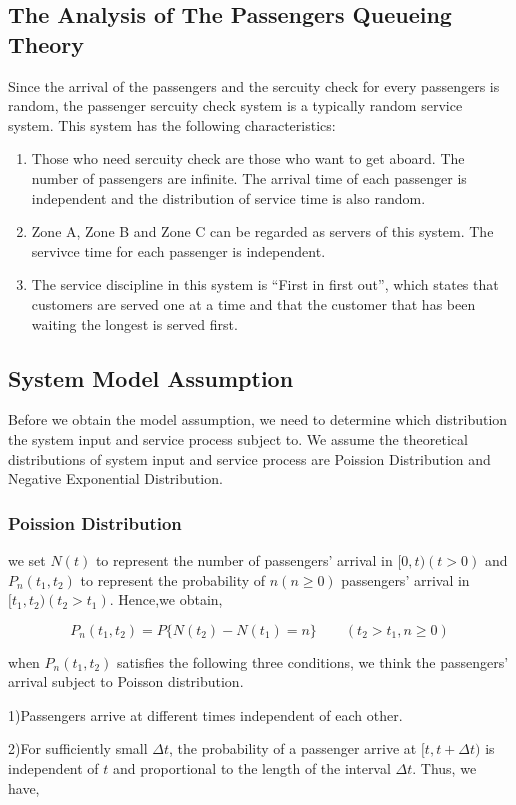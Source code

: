 \documentclass{mcmthesis}
\begin{document}
\subsection{The Analysis of The Passengers Queueing Theory}
		Since the arrival of the passengers and the sercuity check for every passengers is random, the passenger sercuity check system is a typically random service system. This system has the following characteristics:
			\begin {enumerate}
				\item Those who need sercuity check are those who want to get aboard. The number of passengers are infinite. The arrival time of each passenger is independent and the distribution of service time is also random.
				\item Zone A, Zone B and Zone C can be regarded as servers of this system. The servivce time for each passenger is independent.
				\item The service discipline in this system is ``First in first out'', which states that customers are served one at a time and that the customer that has been waiting the longest is served first.
			\end{enumerate}
\subsection{System Model Assumption}%
Before we obtain the model assumption, we need to determine which distribution the system input and service process subject to. We assume the theoretical distributions of system input and service process are Poission Distribution and Negative Exponential Distribution.
\subsubsection{ Poission  Distribution}
we set $ N(t) $ to represent the number of passengers'  arrival in $ [0,t)(t>0) $ and $ P_n(t_1,t_2) $
to represent the probability of $ n(n\geqslant 0) $ passengers'  arrival  in $ [t_1,t_2)(t_2>t_1) $. Hence,we obtain,

\begin{equation}
P_n(t_1,t_2)=P\{  N(t_2)-N(t_1) =n \} \qquad (t_2>t_1,n\geqslant 0)
\end{equation}

when $P_n(t_1,t_2)$ satisfies the following three conditions, we think the passengers'  arrival subject to Poisson distribution.
\par 1)Passengers arrive at different times independent of each other.
\par 2)For sufficiently small $\Delta t$, the probability of a passenger arrive at $[t,t+\Delta t)$ is independent of $t$ and proportional to the length of the interval  $\Delta t$.
Thus, we have,
\end{document}
